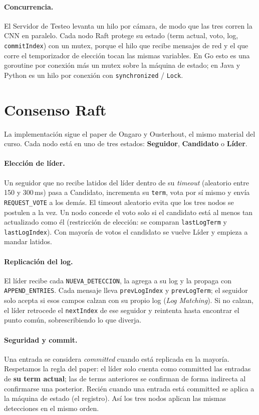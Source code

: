 \documentclass[11pt,a4paper]{article}
\begin{document}
\paragraph{Concurrencia.} El Servidor de Testeo levanta un hilo por c\'amara, de
modo que las tres corren la CNN en paralelo. Cada nodo Raft protege su estado
(term actual, voto, log, \texttt{commitIndex}) con un mutex, porque el hilo que
recibe mensajes de red y el que corre el temporizador de elecci\'on tocan las
mismas variables. En Go esto es una goroutine por conexi\'on m\'as un mutex sobre
la m\'aquina de estado; en Java y Python es un hilo por conexi\'on con
\texttt{synchronized} / \texttt{Lock}.

\section{Consenso Raft}\label{sec:raft}
La implementaci\'on sigue el paper de Ongaro y Ousterhout, el mismo material del
curso. Cada nodo est\'a en uno de tres estados: \textbf{Seguidor},
\textbf{Candidato} o \textbf{L\'ider}.

\paragraph{Elecci\'on de l\'ider.} Un seguidor que no recibe latidos del l\'ider
dentro de su \emph{timeout} (aleatorio entre 150 y 300\,ms) pasa a Candidato,
incrementa su \texttt{term}, vota por s\'i mismo y env\'ia \texttt{REQUEST\_VOTE}
a los dem\'as. El timeout aleatorio evita que los tres nodos se postulen a la vez.
Un nodo concede el voto solo si el candidato est\'a al menos tan actualizado como
\'el (restricci\'on de elecci\'on: se comparan \texttt{lastLogTerm} y
\texttt{lastLogIndex}). Con mayor\'ia de votos el candidato se vuelve L\'ider y
empieza a mandar latidos.

\paragraph{Replicaci\'on del log.} El l\'ider recibe cada
\texttt{NUEVA\_DETECCION}, la agrega a su log y la propaga con
\texttt{APPEND\_ENTRIES}. Cada mensaje lleva \texttt{prevLogIndex} y
\texttt{prevLogTerm}; el seguidor solo acepta si esos campos calzan con su propio
log (\emph{Log Matching}). Si no calzan, el l\'ider retrocede el
\texttt{nextIndex} de ese seguidor y reintenta hasta encontrar el punto com\'un,
sobrescribiendo lo que diverja.

\paragraph{Seguridad y commit.} Una entrada se considera \emph{committed} cuando
est\'a replicada en la mayor\'ia. Respetamos la regla del paper: el l\'ider solo
cuenta como committed las entradas de \textbf{su term actual}; las de terms
anteriores se confirman de forma indirecta al confirmarse una posterior. Reci\'en
cuando una entrada est\'a committed se aplica a la m\'aquina de estado (el
registro). As\'i los tres nodos aplican las mismas detecciones en el mismo orden.
\end{document}
